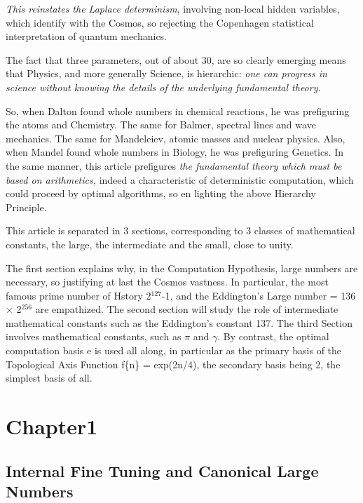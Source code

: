 \documentclass[twoside,draft]{article}
\begin{document}
{\textit{This reinstates the Laplace determinism}, involving non-local hidden variables, which identify with the Cosmos, so rejecting the Copenhagen statistical interpretation of quantum mechanics.

The fact that three parameters, out of about 30, are so clearly emerging means that Physics, and more generally Science, is hierarchic: \textit{one can progress in science without knowing the details of the underlying fundamental theory.}

So, when Dalton found whole numbers in chemical reactions, he was prefiguring the atoms and Chemistry. The same for Balmer, spectral lines and wave mechanics. The same for Mandeleiev, atomic masses and nuclear physics. Also, when Mandel found whole numbers in Biology, he was prefiguring Genetics. In the same manner, this article prefigures \textit{the fundamental theory which must be based on arithmetics,} indeed a characteristic of deterministic computation, which could proceed by optimal algorithms, so en lighting the above Hierarchy Principle.

This article is separated in 3 sections, corresponding to 3 classes of mathematical constants, the large, the intermediate and the small, close to unity.

The first section explains why, in the Computation Hypothesis, large numbers are necessary, so justifying at last the Cosmos vastness. In particular,  the most famous prime number of Hstory 2$^{127}\!$-1, and the Eddington's Large number = 136 $\times$ 2$^{256}\!$  are empathized. The second section will study the role of intermediate mathematical constants such as the Eddington's constant 137. The third Section involves mathematical constants, such as $\pi$ and $\gamma$.  By contrast, the optimal computation basis e is used all along, in particular as the primary basis of the Topological Axis Function f\{n\} = exp(2n/4), the secondary basis being 2, the simplest basis of all.

\section {Chapter1}
\subsection {Internal Fine Tuning and Canonical Large Numbers}

}
\end{document}
